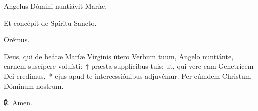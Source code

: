 
\noindent \vv Angelus Dómini nuntiávit Maríæ.

\noindent \rr Et concépit de Spíritu San\-cto.


%
%

Orémus.

\noindent Deus, qui de beátæ Maríæ Vírginis útero Verbum tuum, Angelo nuntiánte, carnem suscípere voluísti:~† præsta supplícibus tuis; ut, qui vere eam Genetrícem Dei credimus,~* ejus apud te intercessiónibus adjuvémur. Per eúmdem Christum Dóminum nostrum.

℟. Amen.